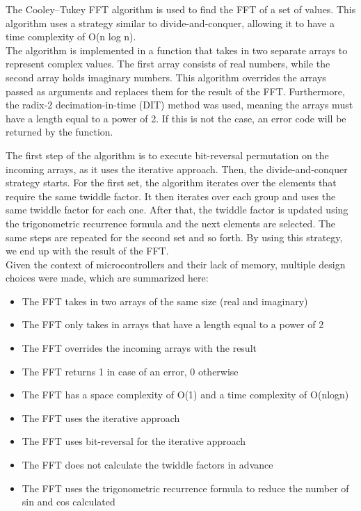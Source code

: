 \documentclass{book}
\begin{document}
The Cooley–Tukey FFT algorithm is used to find the FFT of a set of values. This algorithm uses a strategy similar to divide-and-conquer, allowing it to have a time complexity of O(n log n). \\

The algorithm is implemented in a function that takes in two separate arrays to represent complex values. The first array consists of real numbers, while the second array holds imaginary numbers. This algorithm overrides the arrays passed as arguments and replaces them for the result of the FFT. Furthermore, the radix-2 decimation-in-time (DIT) method was used, meaning the arrays must have a length equal to a power of 2. If this is not the case, an error code will be returned by the function. 

The first step of the algorithm is to execute bit-reversal permutation on the incoming arrays, as it uses the iterative approach. Then, the divide-and-conquer strategy starts. For the first set, the algorithm iterates over the elements that require the same twiddle factor. It then iterates over each group and uses the same twiddle factor for each one. After that, the twiddle factor is updated using the trigonometric recurrence formula and the next elements are selected. The same steps are repeated for the second set and so forth. By using this strategy, we end up with the result of the FFT.\\


Given the context of microcontrollers and their lack of memory, multiple design choices were made, which are summarized here:
\begin{itemize}
	\item The FFT takes in two arrays of the same size (real and imaginary)
	\item The FFT only takes in arrays that have a length equal to a power of 2
	\item The FFT overrides the incoming arrays with the result
	\item The FFT returns 1 in case of an error, 0 otherwise
	\item The FFT has a space complexity of O(1) and a time complexity of O(nlogn)
	\item The FFT uses the iterative approach
	\item The FFT uses bit-reversal for the iterative approach
	\item The FFT does not calculate the twiddle factors in advance
	\item The FFT uses the trigonometric recurrence formula to reduce the number of sin and cos calculated
\end{itemize}
\end{document}
